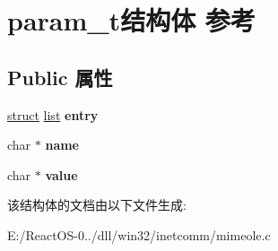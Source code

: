 \hypertarget{structparam__t}{}\section{param\+\_\+t结构体 参考}
\label{structparam__t}
\subsection*{Public 属性}
\begin{DoxyCompactItemize}
\item 
\mbox{\label{structparam__t_a348448d992cdea406153ab82eea5fd7b}} 
\hyperlink{interfacestruct}{struct} \hyperlink{classlist}{list} {\bfseries entry}
\item 
\mbox{\label{structparam__t_a5194c8d3ccca2d7fe4b77d1868a5cb9e}} 
char $\ast$ {\bfseries name}
\item 
\mbox{\label{structparam__t_a5705842eb11bb6cf27a5a932747438b0}} 
char $\ast$ {\bfseries value}
\end{DoxyCompactItemize}


该结构体的文档由以下文件生成\+:\begin{DoxyCompactItemize}
\item 
E\+:/\+React\+O\+S-\/0../dll/win32/inetcomm/mimeole.\+c\end{DoxyCompactItemize}
